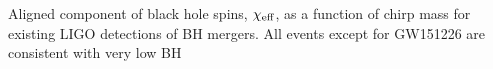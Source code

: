  \label{fig:BHspin} Aligned component of black hole spins, $\chi_{\rm eff}$, as a function of chirp mass for existing LIGO detections of BH mergers. All events except for GW151226 are consistent with very low BH
